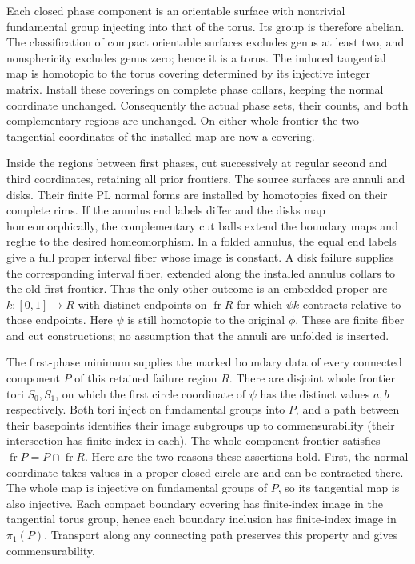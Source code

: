 Each closed phase component is an orientable surface with nontrivial
fundamental group injecting into that of the torus. Its group is therefore
abelian. The classification of compact orientable surfaces excludes genus
at least two, and nonsphericity excludes genus zero; hence it is a torus.
The induced tangential map is homotopic to the torus covering determined
by its injective integer matrix. Install these coverings on complete
phase collars, keeping the normal coordinate unchanged. Consequently
the actual phase sets, their counts, and both complementary regions are
unchanged. On either whole frontier the two tangential coordinates of
the installed map are now a covering.

Inside the regions between first phases, cut successively at regular
second and third coordinates, retaining all prior frontiers.
The source surfaces are annuli and disks. Their finite PL normal forms
are installed by homotopies fixed on their complete rims. If the annulus
end labels differ and the disks map homeomorphically, the complementary
cut balls extend the boundary maps and reglue to the desired
homeomorphism. In a folded annulus, the equal end labels give a full
proper interval fiber whose image is constant. A disk failure supplies
the corresponding interval fiber, extended along the installed annulus
collars to the old first frontier. Thus the only other outcome is an
embedded proper arc $k:[0,1]\to R$ with distinct endpoints on
$\operatorname{fr}R$ for which $\psi k$ contracts relative to those
endpoints. Here $\psi$ is still homotopic to the original $\phi$.
These are finite fiber and cut constructions; no assumption that the
annuli are unfolded is inserted.

The first-phase minimum supplies the marked boundary data of every
connected component $P$ of this retained failure region $R$. There
are disjoint whole frontier tori $S_0,S_1$, on which the first circle
coordinate of $\psi$ has the distinct values $a,b$ respectively.
Both tori inject on fundamental groups into $P$, and a path between
their basepoints identifies their image subgroups up to commensurability
(their intersection has finite index in each). The whole component
frontier satisfies $\operatorname{fr}P=P\cap\operatorname{fr}R$.
Here are the two reasons these
assertions hold. First, the normal coordinate takes values in a proper
closed circle arc and can be contracted there. The whole map is
injective on fundamental groups of $P$, so its tangential map is also
injective. Each compact boundary covering has finite-index image in
the tangential torus group, hence each boundary inclusion has
finite-index image in $\pi_1(P)$. Transport along any connecting path
preserves this property and gives commensurability.

